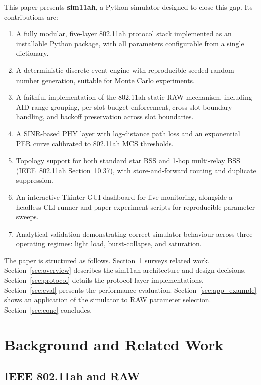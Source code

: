 \documentclass[conference]{IEEEtran}
\begin{document}
This paper presents \textbf{sim11ah}, a Python simulator designed to close
this gap.
Its contributions are:
\begin{enumerate}
  \item A fully modular, five-layer 802.11ah protocol stack implemented as an
        installable Python package, with all parameters configurable from a
        single dictionary.
  \item A deterministic discrete-event engine with reproducible seeded random
        number generation, suitable for Monte Carlo experiments.
  \item A faithful implementation of the 802.11ah static RAW mechanism,
        including AID-range grouping, per-slot budget enforcement, cross-slot
        boundary handling, and backoff preservation across slot boundaries.
  \item A SINR-based PHY layer with log-distance path loss and an exponential
        PER curve calibrated to 802.11ah MCS thresholds.
  \item Topology support for both standard star BSS and 1-hop multi-relay BSS
        (IEEE~802.11ah Section~10.37), with store-and-forward routing and
        duplicate suppression.
  \item An interactive Tkinter GUI dashboard for live monitoring, alongside a
        headless CLI runner and paper-experiment scripts for reproducible
        parameter sweeps.
  \item Analytical validation demonstrating correct simulator behaviour across
        three operating regimes: light load, burst-collapse, and saturation.
\end{enumerate}

The paper is structured as follows.
Section~\ref{sec:related} surveys related work.
Section~\ref{sec:overview} describes the sim11ah architecture and design
decisions.
Section~\ref{sec:protocol} details the protocol layer implementations.
Section~\ref{sec:eval} presents the performance evaluation.
Section~\ref{sec:app_example} shows an application of the simulator to RAW
parameter selection.
Section~\ref{sec:conc} concludes.

\section{Background and Related Work}
\label{sec:related}

\subsection{IEEE 802.11ah and RAW}
\end{document}

